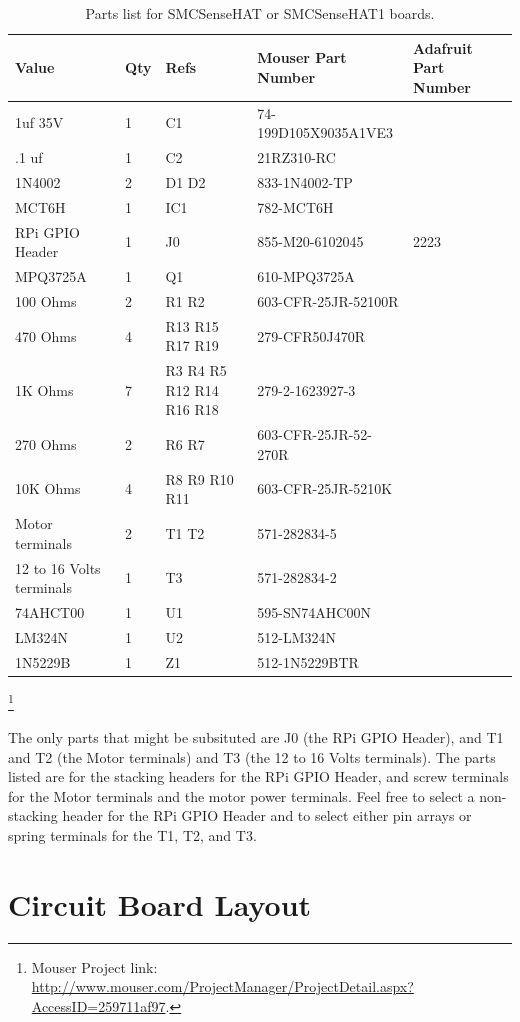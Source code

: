 \begin{table}[htdp]
\begin{centering}\begin{tabular}{|l|l|p{1in}|l|p{.5in}|}
\hline
Value&Qty&Refs&Mouser Part Number&Adafruit Part Number \\
\hline
1uf 35V&1&C1&74-199D105X9035A1VE3& \\
\hline
.1 uf&1&C2&21RZ310-RC& \\
\hline
1N4002&2&D1 D2&833-1N4002-TP& \\
\hline
MCT6H&1&IC1&782-MCT6H& \\
\hline
RPi GPIO Header&1&J0&855-M20-6102045&2223 \\
\hline
MPQ3725A&1&Q1&610-MPQ3725A& \\
\hline
100 Ohms&2&R1 R2&603-CFR-25JR-52100R& \\
\hline
470 Ohms&4&R13 R15 R17 R19&279-CFR50J470R& \\
\hline
1K Ohms&7&R3 R4 R5 R12 R14 R16 R18&279-2-1623927-3& \\
\hline
270 Ohms&2&R6 R7&603-CFR-25JR-52-270R& \\
\hline
10K Ohms&4&R8 R9 R10 R11&603-CFR-25JR-5210K& \\
\hline
Motor terminals&2&T1 T2&571-282834-5& \\
\hline
12 to 16 Volts terminals&1&T3&571-282834-2& \\
\hline
74AHCT00&1&U1&595-SN74AHC00N& \\
\hline
LM324N&1&U2&512-LM324N& \\
\hline
1N5229B&1&Z1&512-1N5229BTR& \\
\hline
\end{tabular}
\caption{Parts list for SMCSenseHAT or SMCSenseHAT1 boards.}
\end{centering}\end{table}\footnote{Mouser Project link: 
\url{http://www.mouser.com/ProjectManager/ProjectDetail.aspx?AccessID=259711af97}.}


The only parts that might be subsituted are J0 (the RPi GPIO Header), and T1 
and T2 (the Motor terminals) and T3 (the 12 to 16 Volts terminals).  The parts 
listed are for the stacking headers for the RPi GPIO Header, and screw 
terminals for the Motor terminals and the motor power terminals.  Feel free to 
select a non-stacking header for the RPi GPIO Header and to select either pin 
arrays or spring terminals for the T1, T2, and T3.


\section{Circuit Board Layout}

